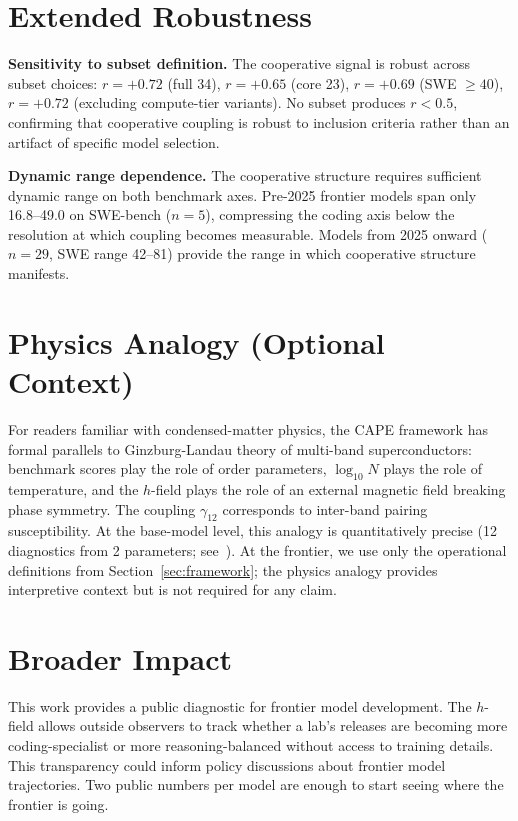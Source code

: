 \documentclass{article}
\begin{document}
\section{Extended Robustness}
\label{app:robustness}

\textbf{Sensitivity to subset definition.}
The cooperative signal is robust across subset choices:
$r = +0.72$ (full 34), $r = +0.65$ (core 23), $r = +0.69$ (SWE $\geq 40$),
$r = +0.72$ (excluding compute-tier variants).
No subset produces $r < 0.5$, confirming that cooperative coupling is robust to
inclusion criteria rather than an artifact of specific model selection.

\textbf{Dynamic range dependence.}
The cooperative structure requires sufficient dynamic range on both benchmark axes.
Pre-2025 frontier models span only 16.8--49.0 on SWE-bench ($n = 5$),
compressing the coding axis below the resolution at which coupling becomes measurable.
Models from 2025 onward ($n = 29$, SWE range 42--81) provide the range
in which cooperative structure manifests.

\section{Physics Analogy (Optional Context)}
\label{app:physics}

For readers familiar with condensed-matter physics, the CAPE framework has formal
parallels to Ginzburg-Landau theory of multi-band superconductors:
benchmark scores play the role of order parameters,
$\log_{10} N$ plays the role of temperature,
and the $h$-field plays the role of an external magnetic field breaking phase symmetry.
The coupling $\gamma_{12}$ corresponds to inter-band pairing susceptibility.
At the base-model level, this analogy is quantitatively precise
(12 diagnostics from 2 parameters; see~\cite{amin2026lying}).
At the frontier, we use only the operational definitions from Section~\ref{sec:framework};
the physics analogy provides interpretive context but is not required for any claim.

\section*{Broader Impact}
This work provides a public diagnostic for frontier model development.
The $h$-field allows outside observers to track whether a lab's releases are becoming
more coding-specialist or more reasoning-balanced without access to training details.
This transparency could inform policy discussions about frontier model trajectories.
Two public numbers per model are enough to start seeing where the frontier is going.
\end{document}
